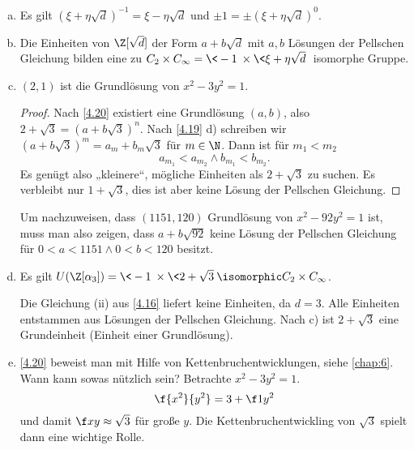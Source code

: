 \begin{nt} \label{4.22}
	\begin{enumerate}[a)]
		\item
			Es gilt $(\xi + \eta \sqrt d)^{-1} = \xi - \eta \sqrt d$ und $\pm 1 = \pm (\xi + \eta \sqrt d)^0$.
		\item
			Die Einheiten von $\Z[\sqrt d]$ der Form $a + b \sqrt d$ mit $a, b$ Lösungen der Pellschen Gleichung bilden eine zu $C_2 \times C_\infty = \<-1\> \times \<\xi + \eta \sqrt d\>$ isomorphe Gruppe.
		\item
			$(2,1)$ ist die Grundlösung von $x^2 - 3y^2 = 1$.
			\begin{proof}
				Nach \ref{4.20} existiert eine Grundlösung $(a,b)$, also $2 + \sqrt 3 = (a + b\sqrt 3)^n$.
				Nach \ref{4.19} d) schreiben wir $(a + b \sqrt 3)^m = a_m + b_m \sqrt 3$ für $m \in \N$.
				Dann ist für $m_1 < m_2$
				\[
					a_{m_1} < a_{m_2} \land b_{m_1} < b_{m_2}.
				\]
				Es genügt also „kleinere“, mögliche Einheiten als $2 + \sqrt 3$ zu suchen.
				Es verbleibt nur $1 + \sqrt 3$, dies ist aber keine Lösung der Pellschen Gleichung.
			\end{proof}
			Um nachzuweisen, dass $(1151, 120)$ Grundlösung von $x^2 - 92y^2 = 1$ ist, muss man also zeigen, dass $a + b\sqrt{92}$ keine Lösung der Pellschen Gleichung für $0 < a < 1151 \land 0 < b < 120$ besitzt.
		\item
			Es gilt $U(\Z[\alpha_3]) = \<-1\> \times \<2 + \sqrt 3\> \isomorphic C_2 \times C_\infty$.

			Die Gleichung (ii) aus \ref{4.16} liefert keine Einheiten, da $d = 3$.
			Alle Einheiten entstammen aus Lösungen der Pellschen Gleichung.
			Nach c) ist $2 + \sqrt 3$ eine Grundeinheit (Einheit einer Grundlösung).
		\item
			\ref{4.20} beweist man mit Hilfe von Kettenbruchentwicklungen, siehe \ref{chap:6}.
			Wann kann sowas nützlich sein?
			Betrachte $x^2 - 3y^2 = 1$.
			\[
				\f{x^2}{y^2} = 3 + \f 1{y^2}
			\]
			und damit $\f xy \approx \sqrt 3$ für große $y$.
			Die Kettenbruchentwickling von $\sqrt 3$ spielt dann eine wichtige Rolle.
	\end{enumerate}
\end{nt}

